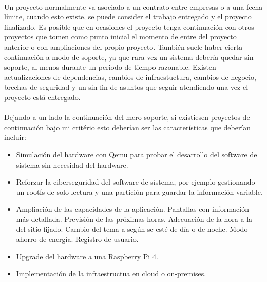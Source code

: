 \paragraph{}Un proyecto normalmente va asociado a un contrato entre empresas o a una
fecha límite, cuando esto existe, se puede consider el trabajo entregado y el proyecto
finalizado. Es posible que en ocasiones el proyecto tenga continuación con otros proyectos
que tomen como punto inicial el momento de entre del proyecto anterior o con ampliaciones
del propio proyecto. También suele haber cierta continuación a modo de soporte, ya que
rara vez un sistema debería quedar sin soporte, al menos durante un periodo de tiempo
razonable. Existen actualizaciones de dependencias, cambios de infraestuctura, cambios
de negocio, brechas de seguridad y un sin fin de asuntos que seguir atendiendo una vez
el proyecto está entregado.

\paragraph{}Dejando a un lado la continuación del mero soporte, si existiesen proyectos
de continuación bajo mi critério esto deberían ser las características que deberían
incluir:

\begin{itemize}
    \item Simulación del hardware con Qemu para probar el desarrollo del software de
    sistema sin necesidad del hardware.
    \item Reforzar la ciberseguridad del software de sistema, por ejemplo gestionando
    un rootfs de solo lectura y una partición para guardar la información variable.
    \item Ampliación de las capacidades de la aplicación.
        \subitem Pantallas con información más detallada.
        \subitem Previsión de las próximas horas.
        \subitem Adecuación de la hora a la del sitio fijado.
        \subitem Cambio del tema a según se esté de día o de noche.
        \subitem Modo ahorro de energía.
        \subitem Registro de usuario.
    \item Upgrade del hardware a una Raspberry Pi 4.
    \item Implementación de la infraestructua en cloud o on-premises.

\end{itemize}


